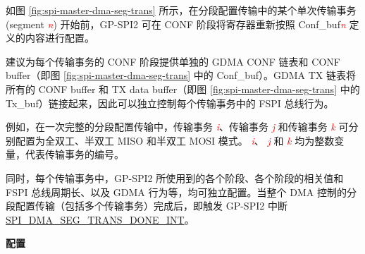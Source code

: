 \documentclass[main\_\_CN.tex]{subfiles}
\begin{document}
如图 \ref{fig:spi-master-dma-seg-trans} 所示，在分段配置传输中的某个单次传输事务 (segment \textcolor{red}{\it{n}}) 开始前，GP-SPI2 可在 CONF 阶段将寄存器重新按照 Conf\_buf\textcolor{red}{\it{n}}  定义的内容进行配置。

建议为每个传输事务的 CONF 阶段提供单独的 GDMA CONF 链表和 CONF buffer（即图 \ref{fig:spi-master-dma-seg-trans} 中的 Conf\_buf）。GDMA TX 链表将所有的 CONF buffer 和 TX data buffer（即图 \ref{fig:spi-master-dma-seg-trans} 中的 Tx\_buf）链接起来，因此可以独立控制每个传输事务中的 FSPI 总线行为。

例如，在一次完整的分段配置传输中，传输事务 \textcolor{red}{\it i}、传输事务 \textcolor{red}{\it j} 和传输事务 \textcolor{red}{\it k} 可分别配置为全双工、半双工 MISO 和半双工 MOSI 模式。 \textcolor{red}{\it i}、 \textcolor{red}{\it j} 和  \textcolor{red}{\it k} 均为整数变量，代表传输事务的编号。 

同时，每个传输事务中，GP-SPI2 所使用到的各个阶段、各个阶段的相关值和 FSPI 总线周期长、以及 GDMA 行为等，均可独立配置。当整个 DMA 控制的分段配置传输（包括多个传输事务）完成后，即触发 GP-SPI2 中断 \hyperref[int:SPIDMASEGTRANSDONEINT]{SPI\_DMA\_SEG\_TRANS\_DONE\_INT}。

\textbf{配置}
\end{document}
